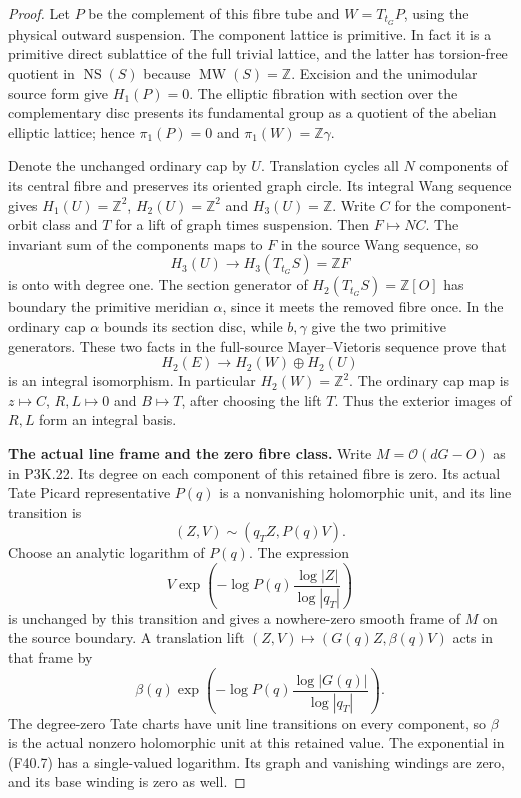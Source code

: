 \begin{proof}
Let $P$ be the complement of this fibre tube and
$W=T_{t_G}P$, using the physical outward suspension. The
component lattice is primitive. In fact it is a primitive
direct sublattice of the full trivial lattice, and the latter
has torsion-free quotient in $\operatorname{NS}(S)$ because
$\operatorname{MW}(S)=\mathbb Z$. Excision and the unimodular
source form give $H_1(P)=0$. The elliptic fibration with section
over the complementary disc presents its fundamental group as
a quotient of the abelian elliptic lattice; hence $\pi_1(P)=0$
and $\pi_1(W)=\mathbb Z\gamma$.

Denote the unchanged ordinary cap by $U$. Translation cycles
all $N$ components of its central fibre and preserves its
oriented graph circle. Its integral Wang sequence gives
$H_1(U)=\mathbb Z^2$, $H_2(U)=\mathbb Z^2$ and $H_3(U)=\mathbb Z$.
Write $C$ for the component-orbit class and $T$ for a lift of
graph times suspension. Then $F\mapsto NC$. The invariant sum
of the components maps to $F$ in the source Wang sequence, so
\[
 H_3(U)\longrightarrow H_3(T_{t_G}S)=\mathbb ZF
\]
is onto with degree one. The section generator of
$H_2(T_{t_G}S)=\mathbb Z[O]$ has boundary the primitive
meridian $\alpha$, since it meets the removed fibre once.
In the ordinary cap $\alpha$ bounds its section disc, while
$b,\gamma$ give the two primitive generators. These two
facts in the full-source Mayer--Vietoris sequence prove that
\[
 H_2(E)\longrightarrow H_2(W)\oplus H_2(U)              \tag{F40.5}
\]
is an integral isomorphism. In particular $H_2(W)=\mathbb Z^2$.
The ordinary cap map is $z\mapsto C$, $R,L\mapsto0$ and
$B\mapsto T$, after choosing the lift $T$. Thus the exterior
images of $R,L$ form an integral basis.

\par\medskip\noindent\textbf{The actual line frame and the zero fibre class.}
Write $M=\mathcal O(dG-O)$ as in P3K.22. Its degree on each
component of this retained fibre is zero. Its actual Tate Picard
representative $P(q)$ is a nonvanishing holomorphic unit, and
its line transition is
\[
                    (Z,V)\sim(q_TZ,P(q)V).
\]
Choose an analytic logarithm of $P(q)$. The expression
\[
 V\exp\left(-\log P(q)\frac{\log|Z|}{\log|q_T|}\right)
                                                               \tag{F40.6}
\]
is unchanged by this transition and gives a nowhere-zero smooth
frame of $M$ on the source boundary. A translation lift
$(Z,V)\mapsto(G(q)Z,\beta(q)V)$ acts in that frame by
\[
 \beta(q)\exp\left(-\log P(q)
                         \frac{\log|G(q)|}{\log|q_T|}\right).
                                                               \tag{F40.7}
\]
The degree-zero Tate charts have unit line transitions on every
component, so $\beta$ is the actual nonzero holomorphic unit
at this retained value. The exponential in (F40.7) has a
single-valued logarithm. Its graph and vanishing windings are
zero, and its base winding is zero as well.


\end{proof}
